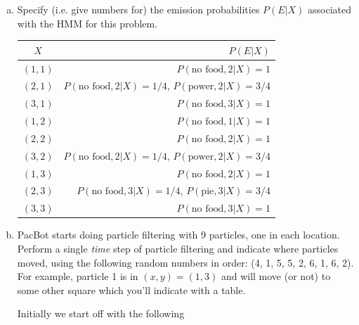 \documentclass[12pt]{article}
\begin{document}
\begin{enumerate}[a)]

\item{Specify (i.e. give numbers for) the emission probabilities
  $P(E|X)$ associated with the HMM for this problem.}

\begin{table}[H]
\centering
\begin{tabular}{c r}
\hline\hline
$X$ & $P(E|X)$\\
\hline
$(1,1)$ & $P(\text{no food},2|X) = 1$\\
$(2,1)$ & $P(\text{no food},2|X) = 1/4$, $P(\text{power},2|X) = 3/4$\\
$(3,1)$ & $P(\text{no food},3|X) = 1$\\
$(1,2)$ & $P(\text{no food},1|X) = 1$\\
$(2,2)$ & $P(\text{no food},2|X) = 1$\\
$(3,2)$ & $P(\text{no food},2|X) = 1/4$, $P(\text{power},2|X) = 3/4$\\
$(1,3)$ & $P(\text{no food},2|X) = 1$\\
$(2,3)$ & $P(\text{no food},3|X) = 1/4$, $P(\text{pie},3|X) = 3/4$\\
$(3,3)$ & $P(\text{no food},3|X) = 1$\\
\hline
\end{tabular}
\end{table}

\item PacBot starts doing particle filtering with 9 particles, one in
  each location.  Perform a single \emph{time} step of particle
  filtering and indicate where particles moved, using the following
  random numbers in order: (4, 1, 5, 5, 2, 6, 1, 6, 2).  For example,
  particle 1 is in $(x,y) = (1,3)$ and will move (or not) to some
  other square which you'll indicate with a table.

Initially we start off with the following

\begin{center}
\end{center}
\end{enumerate}
\end{document}
